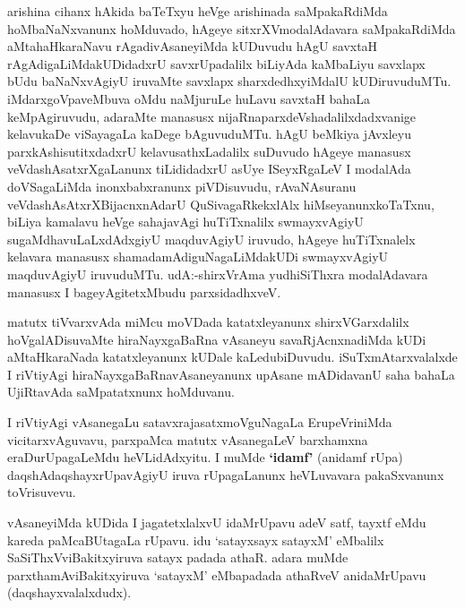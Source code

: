 \centerline{}

\begin{artha}
arishina cihanx hAkida baTeTxyu heVge arishinada saMpakaRdiMda
hoMbaNaNxvanunx hoMduvado, hAgeye sitxrXVmodalAdavara saMpakaRdiMda
aMtahaHkaraNavu rAgadivAsaneyiMda kUDuvudu hAgU savxtaH
rAgAdigaLiMdakUDidadxrU savxrUpadalilx biLiyAda kaMbaLiyu savxlapx
bUdu baNaNxvAgiyU iruvaMte savxlapx sharxdedhxyiMdalU
kUDiruvuduMTu. iMdarxgoVpaveMbuva oMdu naMjuruLe huLavu savxtaH bahaLa
keMpAgiruvudu, adaraMte manasusx nijaRnaparxdeVshadalilxdadxvanige
kelavukaDe viSayagaLa kaDege bAguvuduMTu. hAgU beMkiya jAvxleyu
parxkAshisutitxdadxrU kelavusathxLadalilx suDuvudo hAgeye manasusx
veVdashAsatxrXgaLanunx tiLididadxrU asUye ISeyxRgaLeV I modalAda
doVSagaLiMda inonxbabxranunx piVDisuvudu, rAvaNAsuranu
veVdashAsAtxrXBijacnxnAdarU QuSivagaRkekxlAlx hiMseyanunxkoTaTxnu,
biLiya kamalavu heVge sahajavAgi huTiTxnalilx swmayxvAgiyU
sugaMdhavuLaLxdAdxgiyU maqduvAgiyU iruvudo, hAgeye huTiTxnalelx
kelavara manasusx shamadamAdiguNagaLiMdakUDi swmayxvAgiyU maqduvAgiyU\break
iruvuduMTu. udA:-shirxVrAma yudhiSiThxra modalAdavara manasusx I
bageyAgitetxMbudu parxsidadhxveV.
\end{artha}
\newpage
\begin{artha}
matutx tiVvarxvAda miMcu moVDada katatxleyanunx shirxVGarxdalilx
hoVgalADisuvaMte hiraNayxgaBaRna vAsaneyu savaRjAcnxnadiMda kUDi
aMtaHkaraNada katatxleyanunx kUDale kaLedubiDuvudu. iSuTxmAtarxvalalxde
I riVtiyAgi hiraNayxgaBaRna\break vAsaneyanunx upAsane mADidavanU saha
bahaLa UjiRtavAda saMpatatxnunx hoMduvanu.
\end{artha}

\begin{artha}
I riVtiyAgi vAsanegaLu satavxrajasatxmoVguNagaLa ErupeVriniMda
vicitarxvAguvavu, parxpaMca matutx vAsanegaLeV barxhamxna
eraDurUpagaLeMdu heVLidAdxyitu. I muMde \textbf{`idamf'} (anidamf rUpa)
daqshAdaqshayxrUpavAgiyU iruva rUpagaLanunx heVLuvavara pakaSxvanunx toVrisuvevu.
\end{artha}

\centerline{}

\begin{artha}
 vAsaneyiMda kUDida I jagatetxlalxvU idaMrUpavu adeV satf, tayxtf eMdu kareda paMcaBUtagaLa rUpavu. idu `satayxsayx satayxM' eMbalilx SaSiThxVviBakitxyiruva satayx padada athaR. adara muMde parxthamAviBakitxyiruva `satayxM' eMbapadada athaRveV anidaMrUpavu (daqshayxvalalxdudx).
\end{artha}

